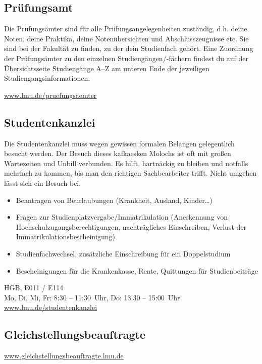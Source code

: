 \subsection{Prüfungsamt}
Die Prüfungsämter sind für alle Prüfungsangelegenheiten zuständig,
d.h. deine Noten, deine Praktika, deine Notenübersichten und
Abschlusszeugnisse etc. Sie sind bei der Fakultät zu finden, zu der
dein Studienfach gehört. Eine Zuordnung der Prüfungsämter zu den
einzelnen Studiengängen/-fächern findest du auf der Übersichtsseite
Studiengänge A--Z am unteren Ende der jeweiligen
Studiengangsinformationen.

\url{www.lmu.de/pruefungsaemter}

\clearpage

\subsection{Studentenkanzlei}

Die Studentenkanzlei muss wegen gewissen formalen Belangen
gelegentlich besucht werden. Der Besuch dieses kafkaesken Molochs ist
oft mit großen Wartezeiten und Unbill verbunden.  Es hilft, hartnäckig
zu bleiben und notfalls mehrfach zu kommen, bis man den richtigen
Sachbearbeiter trifft. Nicht umgehen lässt sich ein Besuch bei:

\begin{itemize}
\item Beantragen von Beurlaubungen (Krankheit, Ausland, Kinder\ldots)
\item Fragen zur Studienplatzvergabe/Immatrikulation (Anerkennung von Hochschulzugangsberechtigungen, nachträgliches Einschreiben, Verlust der Immatrikulationsbescheinigung)
\item Studienfachwechsel, zusätzliche Einschreibung für ein Doppelstudium
\item Bescheinigungen für die Krankenkasse, Rente, Quittungen für Studienbeiträge
\end{itemize}

HGB, E011 / E114\\
Mo, Di, Mi, Fr: 8:30 -- 11:30~Uhr, Do: 13:30 -- 15:00~Uhr\\
\url{www.lmu.de/studentenkanzlei}


\subsection{Gleichstellungsbeauftragte}

\url{www.gleichstellungsbeauftragte.lmu.de}

